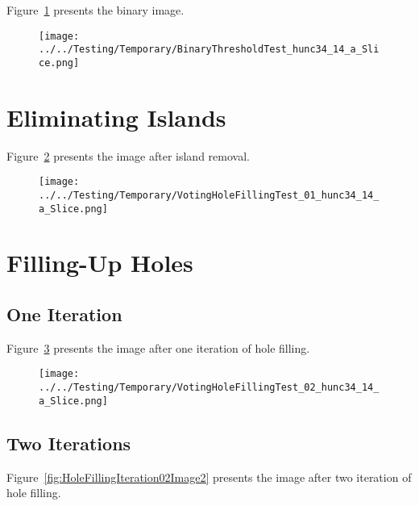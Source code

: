 \documentclass{InsightArticle}
\begin{document}
Figure~\ref{fig:BinaryImage2} presents the binary image.

\begin{figure}
\center
\texttt{[image: ../../Testing/Temporary/BinaryThresholdTest\_hunc34\_14\_a\_Slice.png]}
\label{fig:BinaryImage2}
\end{figure}


\section{Eliminating Islands}

Figure~\ref{fig:IslandRemovalImage2} presents the image after island removal.

\begin{figure}
\center
\texttt{[image: ../../Testing/Temporary/VotingHoleFillingTest\_01\_hunc34\_14\_a\_Slice.png]}
\label{fig:IslandRemovalImage2}
\end{figure}


\section{Filling-Up Holes}

\subsection{One Iteration}

Figure~\ref{fig:HoleFillingIteration01Image2} presents the image after one iteration of hole filling.

\begin{figure}
\center
\texttt{[image: ../../Testing/Temporary/VotingHoleFillingTest\_02\_hunc34\_14\_a\_Slice.png]}
\label{fig:HoleFillingIteration01Image2}
\end{figure}



\subsection{Two Iterations}

Figure~\ref{fig:HoleFillingIteration02Image2} presents the image after two iteration of hole filling.
\end{document}
